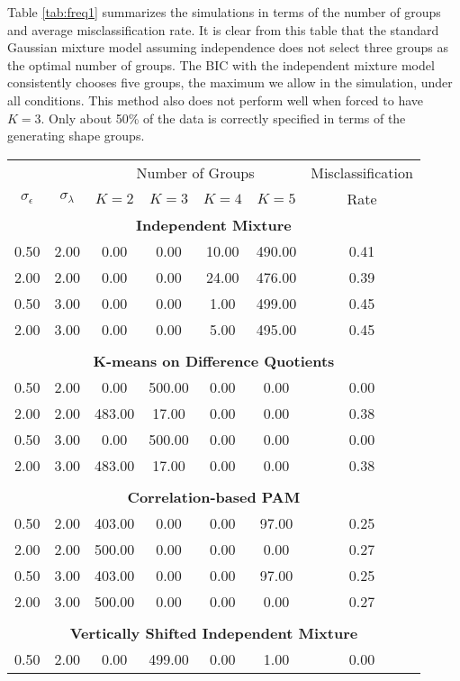 \documentclass[12pt]{article}
\begin{document}
Table \ref{tab:freq1} summarizes the simulations in terms of the number of groups and average misclassification rate. It is clear from this table that the standard Gaussian mixture model assuming independence does not select three groups as the optimal number of groups. The BIC with the independent mixture model consistently chooses five groups, the maximum we allow in the simulation, under all conditions. This method also does not perform well when forced to have $K=3$. Only about 50\% of the data is correctly specified in terms of the generating shape groups.
\begin{table}[ht]
\begin{center}
\begin{tabular}{cc|ccccc}
  \hline &&\multicolumn{4}{c}{Number of Groups}&Misclassification\\ $\sigma_{\epsilon}$&$\sigma_{\lambda}$&$K=2$&$K=3$&$K=4$&$K=5$&Rate\\ \hline\multicolumn{7}{c}{\textbf{Independent Mixture}}\\ 0.50 & 2.00 & 0.00 & 0.00 & 10.00 & 490.00 & 0.41 \\ 
  2.00 & 2.00 & 0.00 & 0.00 & 24.00 & 476.00 & 0.39 \\ 
  0.50 & 3.00 & 0.00 & 0.00 & 1.00 & 499.00 & 0.45 \\ 
  2.00 & 3.00 & 0.00 & 0.00 & 5.00 & 495.00 & 0.45 \\ 
   \\ \multicolumn{7}{c}{\textbf{K-means on Difference Quotients}}\\0.50 & 2.00 & 0.00 & 500.00 & 0.00 & 0.00 & 0.00 \\ 
  2.00 & 2.00 & 483.00 & 17.00 & 0.00 & 0.00 & 0.38 \\ 
  0.50 & 3.00 & 0.00 & 500.00 & 0.00 & 0.00 & 0.00 \\ 
  2.00 & 3.00 & 483.00 & 17.00 & 0.00 & 0.00 & 0.38 \\ 
   \\ \multicolumn{7}{c}{\textbf{Correlation-based PAM}}\\0.50 & 2.00 & 403.00 & 0.00 & 0.00 & 97.00 & 0.25 \\ 
  2.00 & 2.00 & 500.00 & 0.00 & 0.00 & 0.00 & 0.27 \\ 
  0.50 & 3.00 & 403.00 & 0.00 & 0.00 & 97.00 & 0.25 \\ 
  2.00 & 3.00 & 500.00 & 0.00 & 0.00 & 0.00 & 0.27 \\ 
   \\ \multicolumn{7}{c}{\textbf{Vertically Shifted Independent Mixture}}\\0.50 & 2.00 & 0.00 & 499.00 & 0.00 & 1.00 & 0.00 \\ 

\end{tabular}
\end{center}
\end{table}
\end{document}
